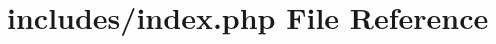 \hypertarget{includes_2index_8php}{}\section{includes/index.php File Reference}
\label{includes_2index_8php}
